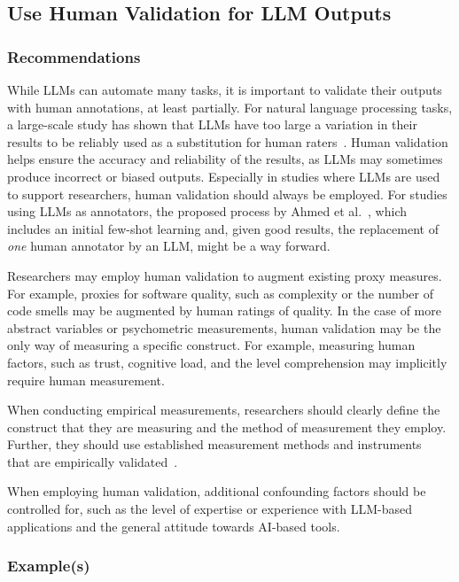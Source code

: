 \documentclass[11pt]{article}
\begin{document}
\subsection{Use Human Validation for LLM Outputs}

\subsubsection{Recommendations}

While LLMs can automate many tasks, it is important to validate their outputs with human annotations, at least partially. 
For natural language processing tasks, a large-scale study has shown that LLMs have too large a variation in their results to be reliably used as a substitution for human raters~\cite{DBLP:journals/corr/abs-2406-18403}. 
Human validation helps ensure the accuracy and reliability of the results, as LLMs may sometimes produce incorrect or biased outputs.
Especially in studies where LLMs are used to support researchers, human validation should always be employed.
For studies using LLMs as annotators, the proposed process by Ahmed et al.~\cite{DBLP:journals/corr/abs-2408-05534}, which includes an initial few-shot learning and, given good results, the replacement of \emph{one} human annotator by an LLM, might be a way forward.

Researchers may employ human validation to augment existing proxy measures.
For example, proxies for software quality, such as complexity or the number of code smells may be augmented by human ratings of quality.
In the case of more abstract variables or psychometric measurements, human validation may be the only way of measuring a specific construct.
For example, measuring human factors, such as trust, cognitive load, and the level comprehension may implicitly require human measurement.

When conducting empirical measurements, researchers should clearly define the construct that they are measuring and the method of measurement they employ.
Further, they should use established measurement methods and instruments~\cite{DBLP:journals/fcomp/HoffmanMKL23} that are empirically validated~\cite{DBLP:conf/chi/PerrigSB23}.

When employing human validation, additional confounding factors should be controlled for, such as the level of expertise or experience with LLM-based applications and the general attitude towards AI-based tools.

\subsubsection{Example(s)}
\end{document}
